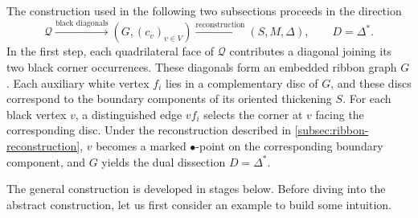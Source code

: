 \documentclass[11pt]{amsart}
\theoremstyle{definition}
\theoremstyle{plain}
\theoremstyle{definition}
\theoremstyle{definition}
\begin{document}
The construction used in the following two subsections proceeds in the direction
\[
  \mathcal Q
  \xrightarrow{\text{black diagonals}}
  (G,(c_v)_{v\in V})
  \xrightarrow{\text{reconstruction}}
  (S,M,\Delta),
  \qquad D=\Delta^*.
\]
In the first step, each quadrilateral face of $\mathcal Q$
contributes a diagonal joining its two black corner occurrences.
These diagonals form an embedded ribbon graph $G$.
Each auxiliary white vertex $f_i$ lies in a complementary
disc of $G$, and these discs correspond to the boundary
components of its oriented thickening $S$.
For each black vertex $v$, a distinguished edge $vf_i$
selects the corner at $v$ facing the corresponding disc.
Under the reconstruction described in
\cref{subsec:ribbon-reconstruction}, $v$ becomes a marked
$\bullet$-point on the corresponding boundary component,
and $G$ yields the dual dissection $D=\Delta^*$. %

The general construction is developed in stages below.
Before diving into the abstract construction, let us first consider an example to build some intuition.
\end{document}
